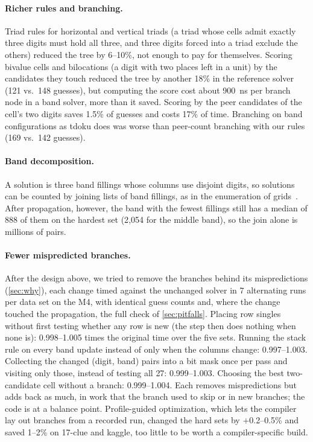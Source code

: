 \documentclass[11pt]{article}
\theoremstyle{definition}
\theoremstyle{plain}
\begin{document}
\paragraph{Richer rules and branching.} Triad rules for horizontal and vertical triads (a triad whose cells admit exactly
three digits must hold all three, and three digits forced into a triad exclude the others) reduced the tree by
6--10\%, not enough to pay for themselves. Scoring bivalue cells and bilocations (a digit with two places left in a
unit) by the candidates they touch reduced the tree by another 18\% in the reference solver (121 vs.\ 148 guesses),
but computing the score cost about \SI{900}{\nano\second} per branch node in a band solver, more than it saved. Scoring by the peer
candidates of the cell's two digits saves 1.5\% of guesses and costs 17\% of time. Branching on band configurations
as tdoku does was worse than peer-count branching with our rules (169 vs.\ 142 guesses).

\paragraph{Band decomposition.} A solution is three band fillings whose columns use disjoint digits, so solutions can
be counted by joining lists of band fillings, as in the enumeration of grids~\cite{felgenhauer2006mathematics}. After
propagation, however, the band with the fewest fillings still has a median of 888 of them on the hardest set (2{,}054
for the middle band), so the join alone is millions of pairs.

\paragraph{Fewer mispredicted branches.} After the design above, we tried to remove the branches behind its
mispredictions (\cref{sec:why}), each change timed against the unchanged solver in 7 alternating runs per data set on
the M4, with identical guess counts and, where the change touched the propagation, the full check of
\cref{sec:pitfalls}. Placing row singles without first testing whether any row is new (the step then does nothing when
none is): 0.998--1.005 times the original time over the five sets. Running the stack rule on every band update instead
of only when the columns change: 0.997--1.003. Collecting the changed (digit, band) pairs into a bit mask once per pass
and visiting only those, instead of testing all 27: 0.999--1.003. Choosing the best two-candidate cell without a
branch: 0.999--1.004. Each removes mispredictions but adds back as much, in work that the branch used to skip or in new
branches; the code is at a balance point. Profile-guided optimization, which lets the compiler lay out branches from a
recorded run, changed the hard sets by $+$0.2--0.5\% and saved 1--2\% on 17-clue and kaggle, too little to be
worth a compiler-specific build.
\end{document}
